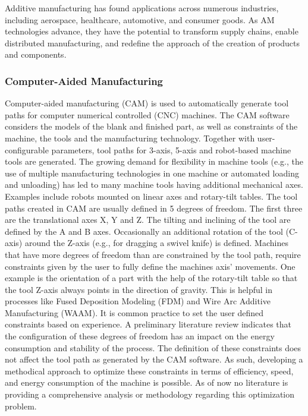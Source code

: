 \documentclass[ZLstudentexpose%
              ,optBiber%
              ,optEnglish%
              ,10pt
              ]{ZLlatex}%
\begin{document}
Additive manufacturing has found applications across numerous industries, including aerospace, healthcare, automotive, and consumer goods. As AM technologies advance, they have the potential to transform supply chains, enable distributed manufacturing, and redefine the approach of the creation of products and components.
\subsubsection{Computer-Aided Manufacturing}\label{CAM}
Computer-aided manufacturing (CAM) is used to automatically generate tool paths for computer numerical controlled (CNC) machines. The CAM software considers the models of the blank and finished part, as well as constraints of the machine, the tools and the manufacturing technology. Together with user-configurable parameters, tool paths for 3-axis, 5-axis and robot-based machine tools are generated.
The growing demand for flexibility in machine tools (e.g., the use of multiple manufacturing technologies in one machine or automated loading and unloading) has led to many machine tools having additional mechanical axes. Examples include robots mounted on linear axes and rotary-tilt tables.
The tool paths created in CAM are usually defined in 5 degrees of freedom. The first three are the translational axes X, Y and Z. The tilting and inclining of the tool are defined by the A and B axes. Occasionally an additional rotation of the tool (C-axis) around the Z-axis (e.g., for dragging a swivel knife) is defined.
Machines that have more degrees of freedom than are constrained by the tool path, require constraints given by the user to fully define the machines axis’ movements. One example is the orientation of a part with the help of the rotary-tilt table so that the tool Z-axis always points in the direction of gravity. This is helpful in processes like Fused Deposition Modeling (FDM) and Wire Arc Additive Manufacturing (WAAM). 
It is common practice to set the user defined constraints based on experience. A preliminary literature review indicates that the configuration of these degrees of freedom has an impact on the energy consumption and stability of the process.
The definition of these constraints does not affect the tool path as generated by the CAM software. As such, developing a methodical approach to optimize these constraints in terms of efficiency, speed, and energy consumption of the machine is possible. As of now no literature is providing a comprehensive analysis or methodology regarding this optimization problem.
\end{document}
